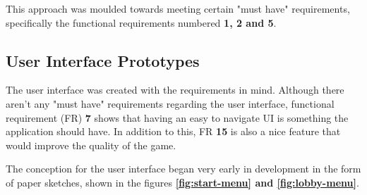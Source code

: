 \documentclass{dissertation}
\begin{document}
This approach was moulded towards meeting certain "must have" requirements, specifically the functional requirements numbered \textbf{1, 2 and 5}.

\subsection{User Interface Prototypes}

The user interface was created with the requirements in mind. Although there aren't any "must have" requirements regarding the user interface, functional requirement (FR) \textbf{7} shows that having an easy to navigate UI is something the application should have. In addition to this, FR \textbf{15} is also a nice feature that would improve the quality of the game.

The conception for the user interface began very early in development in the form of paper sketches, shown in the figures \textbf{\ref{fig:start-menu} and \ref{fig:lobby-menu}}.
\end{document}
